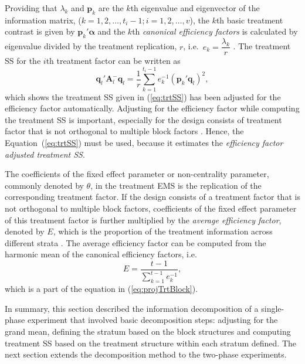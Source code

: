 \documentclass[article]{jss}
\newcommand{\A}{\mathbf{A}}
\begin{document}
Providing that $\lambda_k$ and $\bm{p}_k$ are the $k$th eigenvalue and eigenvector of the information matrix, ($k = 1,2,\dots,t_i - 1; i = 1,2,\dots,v$), the $k$th basic treatment contrast is given by $\bm{p}_k'\bm{\alpha}$ and the $k$th \emph{canonical efficiency factors} is calculated by eigenvalue divided by the treatment replication, $r$, i.e.\ $e_k = \dfrac{\lambda_k}{r}$ \citep{John1987}. The treatment SS for the $i$th treatment factor can be written as 
\begin{equation}\label{eq:projTrtBlock}
 \bm{q}_{l}' \A_{l}^{-} \bm{q}_{l} = \dfrac{1}{r} \sum^{t_i - 1}_{k = 1} e_k^{-1} (\bm{p}_k' \bm{q}_{l})^2,
\end{equation}
which shows the treatment SS given in (\ref{eq:trtSS}) has been adjusted for the efficiency factor automatically. Adjusting for the efficiency factor while computing the treatment SS is important, especially for the design consists of treatment factor that is not orthogonal to multiple block factors \citep{Brien2009}. Hence, the Equation~(\ref{eq:trtSS}) must be used, because it estimates the \emph{efficiency factor adjusted treatment SS}. 

The coefficients of the fixed effect parameter or non-centrality parameter, commonly denoted by $\theta$, in the treatment EMS is the replication of the corresponding treatment factor. If the design consists of a treatment factor that is not orthogonal to multiple block factors, coefficients of the fixed effect parameter of this treatment factor is further multiplied by the \emph{average efficiency factor}, denoted by $E$, which is the proportion of the treatment information across different strata \citep{Yates1936}. The average efficiency factor can be computed from the harmonic mean of the canonical efficiency factors, i.e.\
\[
E = \dfrac{t-1}{\sum^{t - 1}_{k = 1} e_k^{-1}},
\]
which is a part of the equation in (\ref{eq:projTrtBlock}).

In summary, this section described the information decomposition of a single-phase experiment that involved basic decomposition steps: adjusting for the grand mean, defining the stratum based on the block structures and computing treatment SS based on the treatment structure within each stratum defined. The next section extends the decomposition method to the two-phase experiments.  
\end{document}
